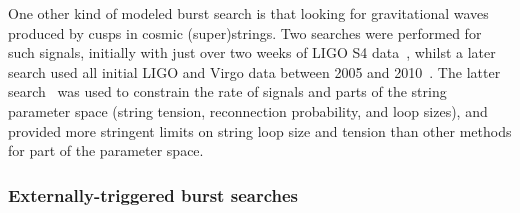 

One other kind of modeled burst search is that looking for gravitational waves produced by cusps in cosmic 
(super)strings. Two searches were performed for such signals, initially with just over two weeks of LIGO S4 
data~\cite{Abbott:2009j}, whilst a later search used all initial LIGO and Virgo data between 2005 
and 2010~\cite{2014PhRvL.112m1101A}. The latter search~\cite{2014PhRvL.112m1101A} was used to constrain the 
rate of signals and parts of the string parameter space (string tension, reconnection probability, and loop sizes),
and provided more stringent limits on string loop size and tension than other methods for part of the parameter space.

\subsubsection{Externally-triggered burst searches}

